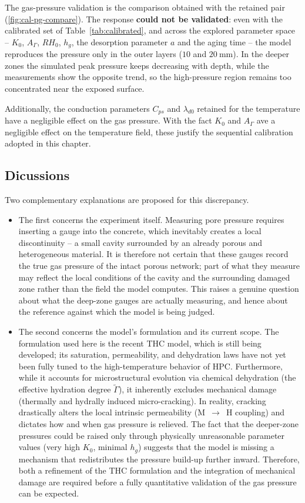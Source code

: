 The gas-pressure validation is the comparison obtained with the retained pair
(\cref{fig:cal-pg-compare}). The response \textbf{could not be validated}: even with the calibrated set of Table~\ref{tab:calibrated}, and across the explored parameter space -- $K_0$, $A_\Gamma$, $RH_0$, $h_g$, the desorption parameter $a$ and the aging time -- the model reproduces the pressure only in the outer layers ($10$ and $20~\mathrm{mm}$). In the deeper zones the simulated peak pressure keeps decreasing with depth, while the measurements show the opposite trend, so the high-pressure region remains too concentrated near the exposed surface. 

Additionally, the conduction parameters $C_{ps}$ and $\lambda_{d0}$ retained for the temperature have a negligible effect on the gas pressure. With the fact $K_0$ and $A_\Gamma$ ave a negligible effect on the temperature field, these justify the sequential calibration adopted in this chapter.

 
\subsection{Dicussions} \label{sec:val-dicussion}

Two complementary explanations are proposed for this discrepancy.
\begin{itemize}

  \item The first concerns the experiment itself. Measuring pore pressure requires inserting a gauge into the concrete, which inevitably creates a local discontinuity -- a small cavity surrounded by an already porous and heterogeneous material. It is therefore not certain that these gauges record the true gas pressure of the intact porous network; part of what they measure may reflect the local conditions of the cavity and the surrounding damaged zone rather than the field the model computes. This raises a genuine question about what the deep-zone gauges are actually measuring, and hence about the reference against which the model is being judged.
 
  \item The second concerns the model's formulation and its current scope. The formulation used here is the recent THC model, which is still being developed; its saturation, permeability, and dehydration laws have not yet been fully tuned to the high-temperature behavior of HPC. Furthermore, while it accounts for microstructural evolution via chemical dehydration (the effective hydration degree $\tilde{\Gamma}$), it inherently excludes mechanical damage (thermally and hydrally induced micro-cracking). In reality, cracking drastically alters the local intrinsic permeability (M~$\rightarrow$~H coupling) and dictates how and when gas pressure is relieved. The fact that the deeper-zone pressures could be raised only through physically unreasonable parameter values (very high $K_0$, minimal $h_g$) suggests that the model is missing a mechanism that redistributes the pressure build-up further inward. Therefore, both a refinement of the THC formulation and the integration of mechanical damage are required before a fully quantitative validation of the gas pressure can be expected.
\end{itemize}

